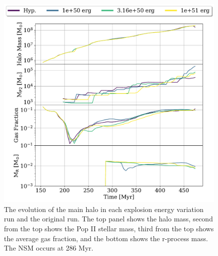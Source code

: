 \documentclass[fleqn,usenatbib]{mnras}
\begin{document}
\begin{figure} 
	\includegraphics[width=\columnwidth]{plots/eng_evolution.pdf}
	\caption[The halo mass, Pop II stellar mass, gas fraction, and r-process mass as a function of time for the explosion energy variation runs.]{The evolution of the main halo in each explosion energy variation run and the original run. The top panel shows the halo mass, second from the top shows the Pop II stellar mass, third from the top shows the average gas fraction, and the bottom shows the r-process mass. The NSM occurs at 286 Myr.}
	\label{fig:eng_evol}
\end{figure}
\end{document}
